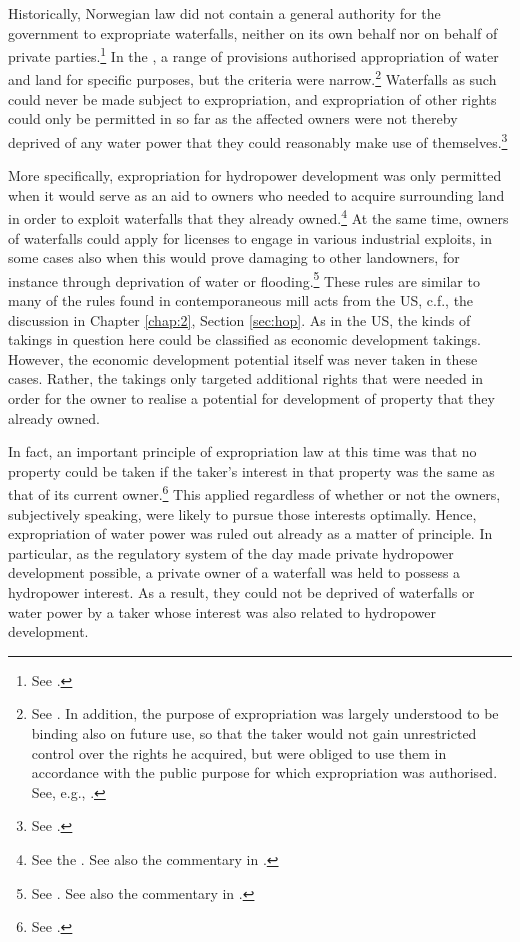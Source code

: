 Historically, Norwegian law did not contain a general authority for the government to expropriate waterfalls, neither on its own behalf nor on behalf of private parties.\footnote{See \cite[29]{amundsen28}.} In the \cite{wra88}, a range of provisions authorised appropriation of water and land for specific purposes, but the criteria were narrow.\footnote{See \cite[69-85]{dahl88}. In addition, the purpose of expropriation was largely understood to be binding also on future use, so that the taker would not gain unrestricted control over the rights he acquired, but were obliged to use them in accordance with the public purpose for which expropriation was authorised. See, e.g., \cite[133-140]{rygh12}.} Waterfalls as such could never be made subject to expropriation, and expropriation of other rights could only be permitted in so far as the affected owners were not thereby deprived of any water power that they could reasonably make use of themselves.\footnote{See \cite[58,60]{dahl88}.}

More specifically, expropriation for hydropower development was only permitted when it would serve as an aid to owners who needed to acquire surrounding land in order to exploit waterfalls that they already owned.\footnote{See the \cite[15-16]{wra88}. See also the commentary in \cite[60-65]{dahl88}.} At the same time, owners of waterfalls could apply for licenses to engage in various industrial exploits, in some cases also when this would prove damaging to other landowners, for instance through deprivation of water or flooding.\footnote{See \cite[14]{wra88}. See also the commentary in \cite[54-60]{dahl88}.} These rules are similar to many of the rules found in contemporaneous mill acts from the US, c.f., the discussion in Chapter \ref{chap:2}, Section \ref{sec:hop}. As in the US, the kinds of takings in question here could be classified as economic development takings. However, the economic development potential itself was never taken in these cases. Rather, the takings only targeted additional rights that were needed in order for the owner to realise a potential for development of property that they already owned.

In fact, an important principle of expropriation law at this time was that no property could be taken if the taker's interest in that property was the same as that of its current owner.\footnote{See \cite[168-170]{dahl88}.} This applied regardless of whether or not the owners, subjectively speaking, were likely to pursue those interests optimally. Hence, expropriation of water power was ruled out already as a matter of principle. In particular, as the regulatory system of the day made private hydropower development possible, a private owner of a waterfall was held to possess a hydropower interest. As a result, they could not be deprived of waterfalls or water power by a taker whose interest was also related to hydropower development.

